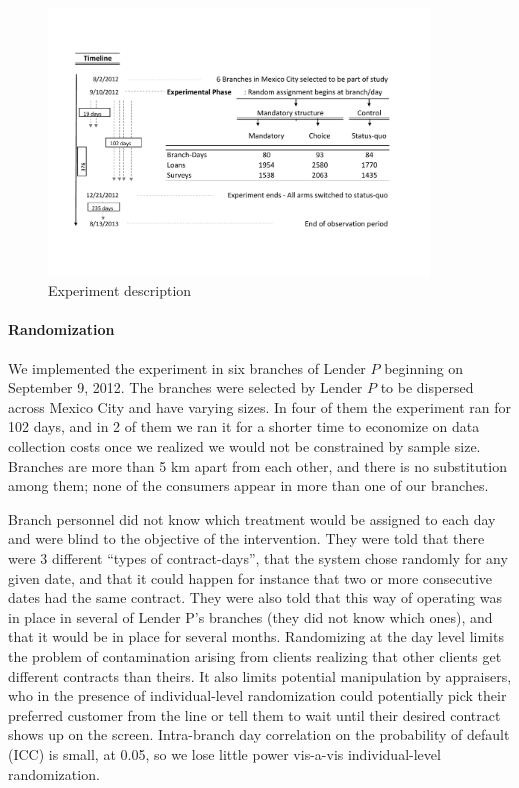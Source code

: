 \documentclass[12pt, a4paper]{article}
\begin{document}
\begin{figure}[htbp]    
 \caption{Experiment description}
\begin{center}
\includegraphics[width=0.9\textwidth]{Figuras/consort.pdf}
  \end{center}
     \label{exp_description}
\end{figure}


\paragraph*{Randomization} We implemented the experiment in six branches of Lender $P$ beginning on September 9, 2012. The branches were selected by Lender $P$ to be dispersed across Mexico City and have varying sizes. In four of them the experiment ran for 102 days, and in 2 of them we ran it for a shorter time to economize on data collection costs once we realized we would not be constrained by sample size. %
Branches are more than 5 km apart from each other, and there is no substitution among them; none of the consumers appear in more than one of our branches.

Branch personnel did not know which treatment would be assigned to each day and were blind to the objective of the intervention. They were told that there were 3 different ``types of contract-days'', that the system chose randomly for any given date, and that it could happen for instance that two or more consecutive dates had the same contract. They were also told that this way of operating was in place in several of Lender P's branches (they did not know which ones), and that it would be in place for several months. Randomizing at the day level limits the problem of contamination arising from clients realizing that other clients get different contracts than theirs. It also limits potential manipulation by appraisers, who in the presence of individual-level randomization could potentially pick their preferred customer from the line or tell them to wait until their desired contract shows up on the screen. Intra-branch day correlation on the probability of default (ICC) is small, at {0.05}, so we lose little power vis-a-vis individual-level randomization.
\end{document}
